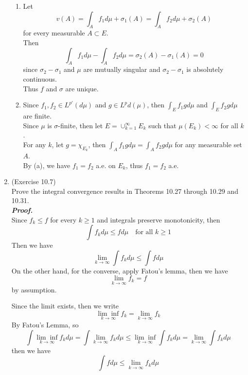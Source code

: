 \documentclass[a4paper,11pt]{article}
\begin{document}
\begin{enumerate}
\begin{enumerate}
			\item
				Let
					$$v(A)
					= \int_A f_1 d\mu + \sigma_1(A)
					= \int_A f_2  d\mu + \sigma_2(A)$$
				for every measurable $A \subset E$.\\
				Then
					$$\int_A f_1 d\mu - \int_A f_2 d\mu
					= \sigma_2(A) - \sigma_1(A)
					= 0$$
				since $\sigma_2 - \sigma_1$ and $\mu$ are mutually singular and $\sigma_2 - \sigma_1$ is absolutely continuous.\\
				Thus $f$ and $\sigma$ are unique.\\

			\item
				Since $f_1, f_2 \in L^{p'}(d\mu)$ and $g \in L^p d(\mu)$, then $\int_E f_1 g d\mu$ and $\int_E f_2 g d\mu$ are finite.\\
				Since $\mu$ is $\sigma$-finite, then let $E = \cup_{k=1}^\infty E_k$ such that $\mu(E_k) < \infty$ for all $k$.\\
				For any $k$, let $g = \chi_{E_k}$, then $\int_A f_1 g d\mu = \int_A f_2g d\mu$ for any measurable set $A$.\\
				By (a), we have $f_1 = f_2$ a.e. on $E_k$, thus $f_1 = f_2$ a.e.\\

		\end{enumerate}


	\item (Exercise 10.7)\\
		Prove the integral convergence results in Theorems 10.27 through 10.29 and 10.31.\\
	\newline
	\textit{\textbf {Proof.}}\\
		Since $f_k \leq f$ for every $k \geq 1$ and integrals preserve monotonicity, then
			$$\int f_k d \mu \leq f d\mu \quad \text{for all } k \geq 1$$
		Then we have
			$$\underset{k \to \infty}{\lim} \int f_k d\mu \leq \int f d\mu$$
		On the other hand, for the converse, apply Fatou's lemma, then we have
			$$\underset{k \to \infty}{\lim} f_k = f$$
		by assumption.\

		Since the limit exists, then we write
			$$\underset{k \to \infty}{\lim \inf} f_k = \underset{k \to \infty}{\lim} f_k$$
		By Fatou's Lemma, so
			$$\int \underset{k \to \infty}{\lim \inf} f_k d\mu
			= \int \underset{k \to \infty}{\lim} f_k d\mu
			\leq \underset{k \to \infty}{\lim \inf} \int f_k d\mu
			= \underset{k \to \infty}{\lim} \int f_k d\mu$$
		then we have
			$$\int f d\mu \leq \underset{k \to \infty}{\lim} f_k d\mu$$



\end{enumerate}
\end{document}
